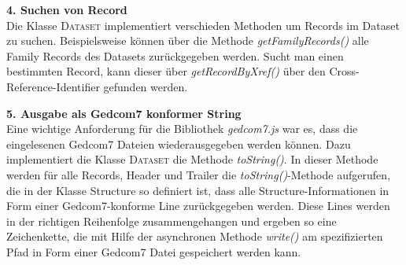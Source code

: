 \vspace{1em}
\textbf{4. Suchen von Record} \vspace{0.5em} \\
Die Klasse \textsc{Dataset} implementiert verschieden Methoden um Records im Dataset zu suchen. Beispielsweise können über die Methode \textit{getFamilyRecords()} alle Family Records des Datasets zurückgegeben werden. Sucht man einen bestimmten Record, kann dieser über \textit{getRecordByXref()} über den Cross-Reference-Identifier gefunden werden. 

\vspace{1em}
\textbf{5. Ausgabe als Gedcom7 konformer String} \vspace{0.5em} \\
Eine wichtige Anforderung für die Bibliothek \textit{gedcom7.js} war es, dass die eingelesenen Gedcom7 Dateien wiederausgegeben werden können. Dazu implementiert die Klasse \textsc{Dataset} die Methode \textit{toString()}. In dieser Methode werden für alle Records, Header und Trailer die \textit{toString()}-Methode aufgerufen, die in der Klasse Structure so definiert ist, dass alle Structure-Informationen in Form einer Gedcom7-konforme Line zurückgegeben werden. Diese Lines werden in der richtigen Reihenfolge zusammengehangen und ergeben so eine Zeichenkette, die mit Hilfe der asynchronen Methode \textit{write()} am spezifizierten Pfad in Form einer Gedcom7 Datei gespeichert werden kann.

